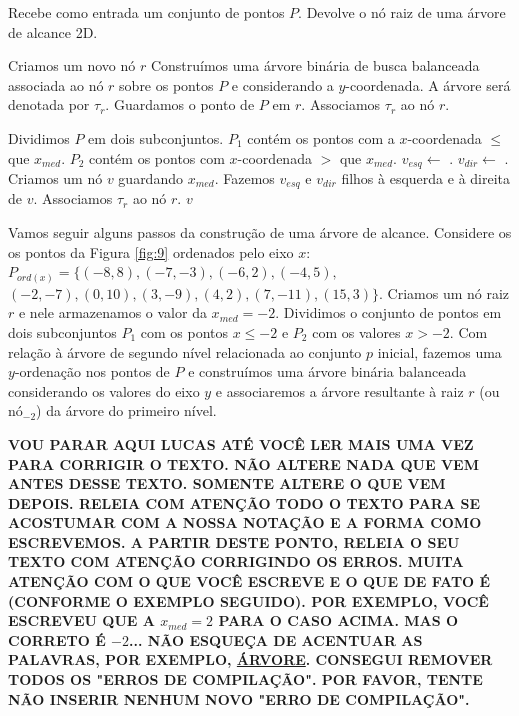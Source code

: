 \begin{algorithm}[h!]
    \caption{Recebe como entrada um conjunto de pontos $P$. Devolve o nó raiz de uma árvore de alcance 2D.}
    \begin{algorithmic}[1]
    \State Criamos um novo nó $r$
        \State Construímos uma árvore binária de busca balanceada associada ao nó $r$ sobre os pontos $P$ e considerando a $y$-coordenada. A árvore será denotada por $\tau_r$.%
            \State Guardamos o ponto de $P$ em $r$.
            \State Associamos $\tau_r$ ao nó $r$. %
            
        \Else
            \State Dividimos $P$ em dois subconjuntos. 
            \State $P_1$ contém os pontos com a $x$-coordenada $\leq$ que $x_{med}$.
            \State $P_2$ contém os pontos com $x$-coordenada $>$ que $x_{med}$.
            \State $v_{esq} \leftarrow $ .
            \State $v_{dir} \leftarrow $ .
            \State Criamos um nó $v$ guardando $x_{med}$.
            \State Fazemos $v_{esq}$ e $v_{dir}$ filhos à esquerda e à direita de $v$.
            \State Associamos $\tau_{r}$ ao nó $r$.
        \EndIf
    \State\Return $v$
    \EndFunction
    \end{algorithmic}
\end{algorithm}


Vamos seguir alguns passos da construção de uma árvore de alcance. Considere os os pontos da Figura \ref{fig:9} ordenados pelo eixo $x$: $P_{ord(x)} = \{(-8,8), (-7, -3), (-6, 2), (-4,5),$ $(-2,-7),(0,10), (3,-9), (4,2), (7,-11), (15,3)\}$. Criamos um nó raiz $r$ e nele armazenamos o valor da $x_{med} = -2$. Dividimos o conjunto de pontos em dois subconjuntos $P_1$ com os pontos $x\leq -2$ e $P_2$ com os valores $x > -2$.
Com relação à árvore de segundo nível relacionada ao conjunto $p$ inicial, fazemos uma $y$-ordenação nos pontos de $P$ e construímos uma árvore binária balanceada considerando os valores do eixo $y$ e associaremos a árvore resultante à raiz $r$ (ou nó$_{-2}$) da árvore do primeiro nível. 

\textbf{VOU PARAR AQUI LUCAS ATÉ VOCÊ LER MAIS UMA VEZ PARA CORRIGIR O TEXTO. NÃO ALTERE NADA QUE VEM ANTES DESSE TEXTO. SOMENTE ALTERE O QUE VEM DEPOIS. RELEIA COM ATENÇÃO TODO O TEXTO PARA SE ACOSTUMAR COM A NOSSA NOTAÇÃO E A FORMA COMO ESCREVEMOS. A PARTIR DESTE PONTO, RELEIA O SEU TEXTO COM ATENÇÃO CORRIGINDO OS ERROS. MUITA ATENÇÃO COM O QUE VOCÊ ESCREVE E O QUE DE FATO É (CONFORME O EXEMPLO SEGUIDO). POR EXEMPLO, VOCÊ ESCREVEU QUE A $x_{med} = 2$ PARA O CASO ACIMA. MAS O CORRETO É $-2$... NÃO ESQUEÇA DE ACENTUAR AS PALAVRAS, POR EXEMPLO, \underline{ÁRVORE}. CONSEGUI REMOVER TODOS OS "ERROS DE COMPILAÇÃO". POR FAVOR, TENTE NÃO INSERIR NENHUM NOVO "ERRO DE COMPILAÇÃO".}

